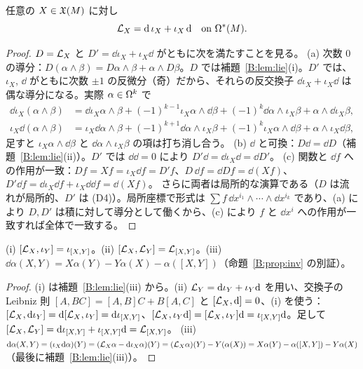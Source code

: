 \begin{thm}\label{B:thm:cartan}\tP
任意の $X\in\mathfrak X(M)$ に対し
\begin{equation}\label{B:eq:cartan}
\mathcal L_X=\mathrm{d}\,\iota_X+\iota_X\,\mathrm{d}\quad\text{on }\Omega^*(M).
\end{equation}
\end{thm}
\begin{proof}
$D=\mathcal L_X$ と $D'=\dd\iota_X+\iota_X\dd$ がともに次を満たすことを見る。
(a) 次数 $0$ の導分：$D(\alpha\wedge\beta)=D\alpha\wedge\beta+\alpha\wedge D\beta$。$D$ では補題~\ref{B:lem:lie}(i)。$D'$ では、$\iota_X$, $\dd$ がともに次数 $\pm1$ の反微分（奇）だから、それらの反交換子 $\dd\iota_X+\iota_X\dd$ は偶な導分になる。実際 $\alpha\in\Omega^k$ で
\begin{align*}
\dd\iota_X(\alpha\wedge\beta)&=\dd\iota_X\alpha\wedge\beta+(-1)^{k-1}\iota_X\alpha\wedge\dd\beta+(-1)^k\dd\alpha\wedge\iota_X\beta+\alpha\wedge\dd\iota_X\beta,\\
\iota_X\dd(\alpha\wedge\beta)&=\iota_X\dd\alpha\wedge\beta+(-1)^{k+1}\dd\alpha\wedge\iota_X\beta+(-1)^k\iota_X\alpha\wedge\dd\beta+\alpha\wedge\iota_X\dd\beta,
\end{align*}
足すと $\iota_X\alpha\wedge\dd\beta$ と $\dd\alpha\wedge\iota_X\beta$ の項は打ち消し合う。
(b) $\dd$ と可換：$D\dd=\dd D$（補題~\ref{B:lem:lie}(ii)）。$D'$ では $\dd\dd=0$ により $D'\dd=\dd\iota_X\dd=\dd D'$。
(c) 関数と $\dd f$ への作用が一致：$Df=Xf=\iota_X\dd f=D'f$、$D\,\dd f=\dd Df=\dd(Xf)$、$D'\dd f=\dd\iota_X\dd f+\iota_X\dd\dd f=\dd(Xf)$。
さらに両者は局所的な演算である（$D$ は流れが局所的、$D'$ は (D4)）。局所座標で形式は $\sum f\,\dd x^{i_1}\wedge\cdots\wedge\dd x^{i_k}$ であり、(a) により $D,D'$ は積に対して導分として働くから、(c) により $f$ と $\dd x^i$ への作用が一致すれば全体で一致する。
\end{proof}

\begin{cor}\label{B:cor:liecalc}\tP
(i) $[\mathcal L_X,\iota_Y]=\iota_{[X,Y]}$。(ii) $[\mathcal L_X,\mathcal L_Y]=\mathcal L_{[X,Y]}$。(iii) $\dd\alpha(X,Y)=X\alpha(Y)-Y\alpha(X)-\alpha([X,Y])$（命題~\ref{B:prop:inv} の別証）。
\end{cor}
\begin{proof}
(i) は補題~\ref{B:lem:lie}(iii) から。(ii) $\mathcal L_Y=\mathrm{d}\iota_Y+\iota_Y\mathrm{d}$ を用い、交換子の Leibniz 則 $[A,BC]=[A,B]C+B[A,C]$ と $[\mathcal L_X,\mathrm{d}]=0$、(i) を使う：
$[\mathcal L_X,\mathrm{d}\iota_Y]=\mathrm{d}[\mathcal L_X,\iota_Y]=\mathrm{d}\iota_{[X,Y]}$、$[\mathcal L_X,\iota_Y\mathrm{d}]=[\mathcal L_X,\iota_Y]\mathrm{d}=\iota_{[X,Y]}\mathrm{d}$。足して $[\mathcal L_X,\mathcal L_Y]=\mathrm{d}\iota_{[X,Y]}+\iota_{[X,Y]}\mathrm{d}=\mathcal L_{[X,Y]}$。
(iii) $\mathrm{d}\alpha(X,Y)=(\iota_X\mathrm{d}\alpha)(Y)=(\mathcal L_X\alpha-\mathrm{d}\iota_X\alpha)(Y)=(\mathcal L_X\alpha)(Y)-Y(\alpha(X))=X\alpha(Y)-\alpha([X,Y])-Y\alpha(X)$（最後に補題~\ref{B:lem:lie}(iii)）。
\end{proof}

